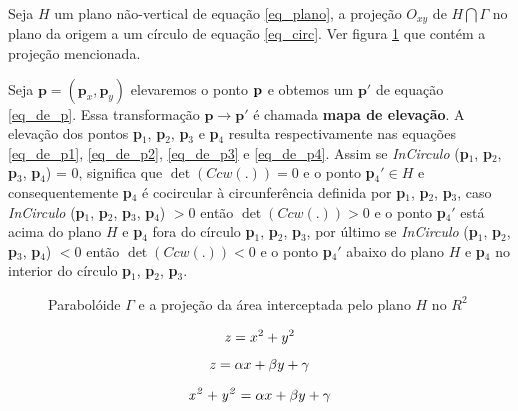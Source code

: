 \documentclass[12pt,a4paper]{book}
\begin{document}
Seja $H$ um plano n\~ao-vertical de equa\c{c}\~{a}o \ref{eq_plano}, a proje\c{c}\~{a}o 
$O_{xy}$ de $H\bigcap\Gamma$ no plano da origem a um c\'irculo de equa\c{c}\~{a}o \ref{eq_circ}.
Ver figura \ref{fig3_2_chapter2} que cont\'em a proje\c{c}\~{a}o mencionada.

Seja $\mathbf{p} = (\mathbf{p}_x,\mathbf{p}_y)$ elevaremos o ponto ${\bf p}$ e obtemos
um ${\mathbf{p'}}$ de equa\c{c}\~{a}o \ref{eq_de_p}. Essa transforma\c{c}\~{a}o $\mathbf{p}\longrightarrow \mathbf{p'}$ \'e chamada {\bf mapa de eleva\c{c}\~{a}o}. A eleva\c{c}\~{a}o dos pontos \textbf{p}$_{1}$, \textbf{p}$_{2}$, \textbf{p}$_{3}$ e \textbf{p}$_{4}$ resulta respectivamente nas equa\c{c}\~{o}es \ref{eq_de_p1}, \ref{eq_de_p2}, \ref{eq_de_p3} e \ref{eq_de_p4}. Assim se \textit{InCirculo }(\textbf{p}$_{1}$, \textbf{p}$_{2}$, \textbf{p}$_{3}$, \textbf{p}$_{4}$) = 0, significa que $\det(Ccw(.))=0$ e o ponto \textbf{p}$_{4}' \in H$ e consequentemente \textbf{p}$_{4}$ \'e cocircular \`a circunfer\^encia definida por \textbf{p}$_{1}$, \textbf{p}$_{2}$, \textbf{p}$_{3}$, caso \textit{InCirculo }(\textbf{p}$_{1}$, \textbf{p}$_{2}$, \textbf{p}$_{3}$, \textbf{p}$_{4}$) $>0$ ent\~ao $\det(Ccw(.))>0$ e o ponto \textbf{p}$_{4}'$ est\'a acima do plano $H$ e \textbf{p}$_{4}$ fora do c\'irculo \textbf{p}$_{1}$, \textbf{p}$_{2}$, \textbf{p}$_{3}$, por \'ultimo se \textit{InCirculo }(\textbf{p}$_{1}$, \textbf{p}$_{2}$, \textbf{p}$_{3}$, \textbf{p}$_{4}$) $<0$ ent\~ao $\det(Ccw(.))<0$ e o ponto \textbf{p}$_{4}'$ abaixo do plano $H$ e \textbf{p}$_{4}$ no interior do c\'irculo \textbf{p}$_{1}$, \textbf{p}$_{2}$, \textbf{p}$_{3}$.

\begin{figure}[htbp]
  \begin{center}
    \leavevmode
    
    \caption{Parabol\'oide $\Gamma$ e a proje\c{c}\~{a}o da \'area interceptada pelo plano $H$ no $R^2$}
    \label{fig3_2_chapter2}
  \end{center}
\end{figure}

\begin{equation} {\label{eq_paraboloid}}
\mathit{z} = x^2 + y^2 
\end{equation}

\begin{equation} {\label{eq_plano}}
\mathit{z} = \alpha x + \beta y + \gamma
\end{equation}

\begin{equation} {\label{eq_circ}}
\mathit{x^2} + \mathit{y^2} = \alpha x + \beta y + \gamma
\end{equation}
\end{document}

